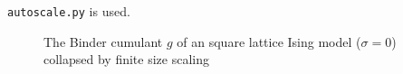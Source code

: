     \texttt{autoscale.py} \cite{autoscale2009} is used.
    \begin{figure}[htbp]
        \centering
        \caption[Examples of Determining Critical Temperature and Exponents]
        {
             The Binder cumulant \(g\)
                of an square lattice Ising model (\(\sigma=0\))\\
             collapsed by finite
                size scaling
        }
        \label{fig:gettingCrit}
    \end{figure}\\

